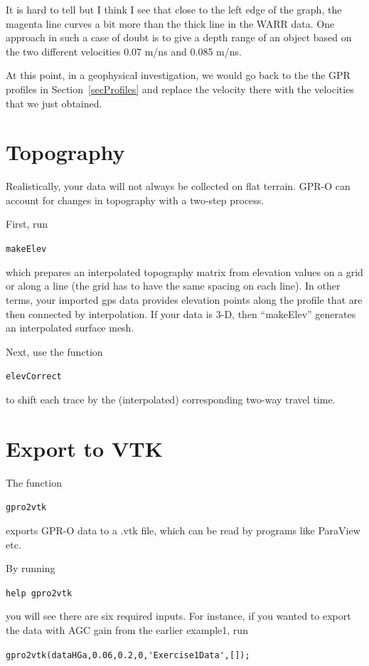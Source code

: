 \documentclass[11pt]{article}
\begin{document}
It is hard to tell but I think I see that close to the left edge of
the graph, the magenta line curves a bit more than the thick line in
the WARR data.  One approach in such a case of doubt is to give a
depth range of an object based on the two different velocities 0.07
m/ns and 0.085 m/ns.

At this point, in a geophysical investigation, we would go back to the
the GPR profiles in Section~\ref{secProfiles} and replace the velocity
there with the velocities that we just obtained.

\section{Topography}

Realistically, your data will not always be collected on flat terrain. 
GPR-O can account for changes in topography with a two-step process.

First, run

\qquad \verb#makeElev#

which prepares an interpolated topography matrix from elevation
values on a grid or along a line (the grid has to have the same spacing on each
line). In other terms, your imported gps data provides elevation points along the profile
that are then connected by interpolation. If your data is 3-D, then ``makeElev''
generates an interpolated surface mesh. 

Next, use the function

\qquad \verb#elevCorrect#

to shift each trace by the (interpolated) corresponding two-way travel
time. 


\section{Export to VTK}

The function

\qquad \verb#gpro2vtk#

exports GPR-O data to a .vtk file, which can be
read by programs like ParaView etc.

By running

\qquad \verb#help gpro2vtk#

you will see there are six required inputs. For instance, if you
wanted to export the data with AGC gain from the earlier example1, run

\qquad \verb#gpro2vtk(dataHGa,0.06,0.2,0,'Exercise1Data',[]);#
\end{document}
